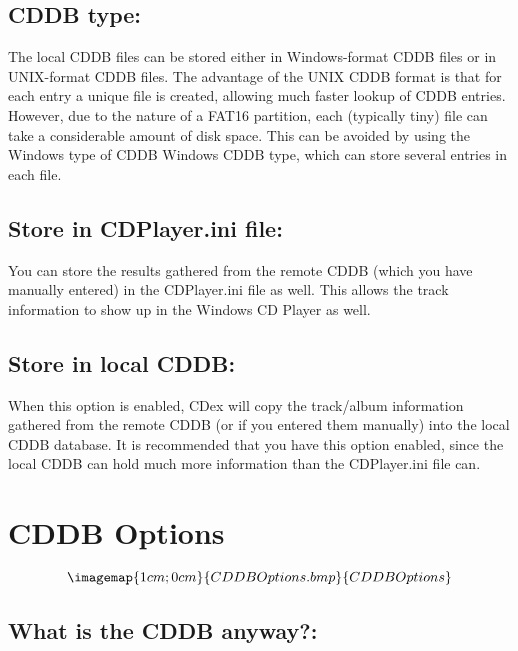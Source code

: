 \subsection{CDDB type:}

The local CDDB files can be stored either in Windows-format CDDB files or in UNIX-format
CDDB files. The advantage of the UNIX CDDB format  is that for each entry
a unique file is created, allowing much faster lookup of CDDB entries.
However, due to the nature of a FAT16 partition, each (typically tiny) file can take a
considerable amount of disk space. This can be avoided by using the Windows
type of CDDB {Windows CDDB type}, which can store several entries in each file.


\subsection{Store in CDPlayer.ini file:}

You can store the results gathered from the remote CDDB (which you have
manually entered) in the CDPlayer.ini file as well. This allows the track
information to show up in the Windows CD Player as well.


\subsection{Store in local CDDB:}

When this option is enabled, CDex will copy the track/album information gathered from the
remote CDDB (or if you entered them manually) into the local CDDB database.
It is recommended that you have this option enabled, since the local CDDB can hold
much more information than the CDPlayer.ini file can.



\section{CDDB Options}\label{cddbsettings}

$$\imagemap{1cm;0cm}{CDDBOptions.bmp}{CDDBOptions}$$


\subsection{What is the CDDB anyway?:}\label{whatiscddb}

